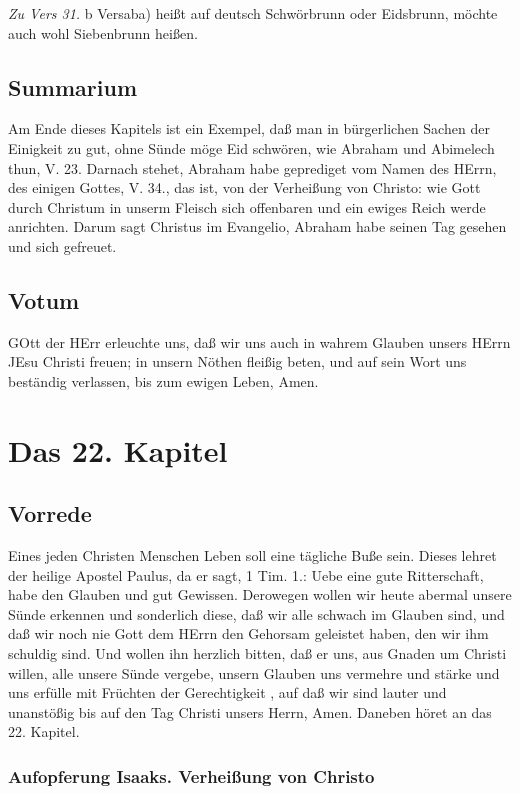 \emph{Zu Vers 31.} b Versaba) heißt auf deutsch Schwörbrunn oder Eidsbrunn, möchte auch wohl Siebenbrunn heißen.

\section{Summarium}

Am Ende dieses Kapitels ist ein Exempel, daß man in bürgerlichen Sachen der Einigkeit zu gut, ohne Sünde möge Eid schwören, wie Abraham und Abimelech thun, V. 23. Darnach stehet, Abraham habe geprediget vom Namen des HErrn, des einigen Gottes, V. 34., das ist, von der Verheißung von Christo: wie Gott durch Christum in unserm Fleisch sich offenbaren und ein ewiges Reich werde anrichten. Darum sagt Christus im Evangelio, Abraham habe seinen Tag gesehen und sich gefreuet.

\section{Votum}

GOtt der HErr erleuchte uns, daß wir uns auch in wahrem Glauben unsers HErrn JEsu Christi freuen; in unsern Nöthen fleißig beten, und auf sein Wort uns beständig verlassen, bis zum ewigen Leben, Amen.

\chapter{Das 22. Kapitel}

\section{Vorrede}

Eines jeden Christen Menschen Leben soll eine tägliche Buße sein. Dieses lehret der heilige Apostel Paulus, da er sagt, 1 Tim. 1.: Uebe eine gute Ritterschaft, habe den Glauben und gut Gewissen. Derowegen wollen wir heute abermal unsere Sünde erkennen und sonderlich diese, daß wir alle schwach im Glauben sind, und daß wir noch nie Gott dem HErrn den Gehorsam geleistet haben, den wir ihm schuldig sind. Und wollen ihn herzlich bitten, daß er uns, aus Gnaden um Christi willen, alle unsere Sünde vergebe, unsern Glauben uns vermehre und stärke und uns erfülle mit Früchten der Gerechtigkeit
, auf daß wir sind lauter und unanstößig bis auf den Tag Christi unsers Herrn, Amen. Daneben höret an das 22. Kapitel.

\subsection{Aufopferung Isaaks. Verheißung von Christo}

